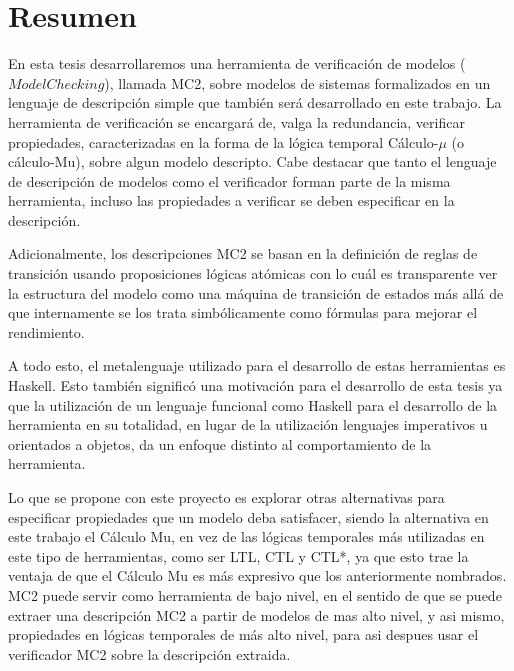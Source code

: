 % 
% 
%
\chapter*{Resumen}

En esta tesis desarrollaremos una herramienta de verificación de modelos ($Model Checking$), llamada MC2, sobre modelos de sistemas formalizados en un lenguaje de descripción simple que también será desarrollado en este trabajo. La herramienta de verificación se encargará de, valga la redundancia, verificar propiedades, caracterizadas en la forma de la lógica temporal Cálculo-$\mu$ (o cálculo-Mu), sobre algun modelo descripto. Cabe destacar que tanto el lenguaje de descripción de modelos como el verificador forman parte de la misma herramienta, incluso las propiedades a verificar se deben especificar en la descripción.

Adicionalmente, los descripciones MC2 se basan en la definición de reglas de transición usando proposiciones lógicas atómicas con lo cuál es transparente ver la estructura del modelo como una máquina de transición de estados más allá de que internamente se los trata simbólicamente como fórmulas para mejorar el rendimiento.

A todo esto, el metalenguaje utilizado para el desarrollo de estas herramientas es Haskell. Esto también significó una motivación para el desarrollo de esta tesis ya que la utilización de un lenguaje funcional como Haskell para el desarrollo de la herramienta en su totalidad, en lugar de la utilización lenguajes imperativos u orientados a objetos, da un enfoque distinto al comportamiento de la herramienta.

Lo que se propone con este proyecto es explorar otras alternativas para especificar propiedades que un modelo deba satisfacer, siendo la alternativa en este trabajo el Cálculo Mu, en vez de las lógicas temporales más utilizadas en este tipo de herramientas, como ser LTL, CTL y CTL*, ya que esto trae la ventaja de que el Cálculo Mu es más expresivo que los anteriormente nombrados. MC2 puede servir como herramienta de bajo nivel, en el sentido de que se puede extraer una descripción MC2 a partir de modelos de mas alto nivel, y asi mismo, propiedades en lógicas temporales de más alto nivel, para asi despues usar el verificador MC2 sobre la descripción extraida.


